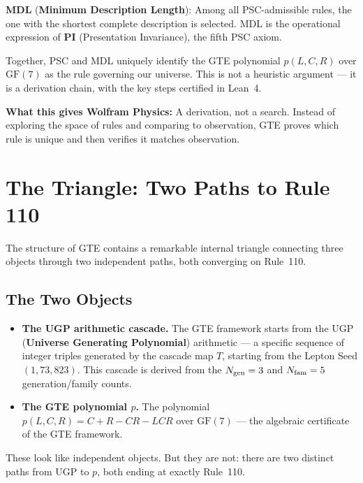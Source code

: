 \documentclass[11pt,a4paper]{article}
\newcommand{\term}[1]{\textbf{#1}}
\begin{document}
\textbf{MDL} (\term{Minimum Description Length}):  Among all PSC-admissible
rules, the one with the shortest complete description is selected.  MDL is the
operational expression of \term{PI} (Presentation Invariance), the fifth PSC
axiom.

Together, PSC and MDL uniquely identify the GTE polynomial $p(L,C,R)$ over
$\mathrm{GF}(7)$ as the rule governing our universe.  This is not a heuristic
argument — it is a derivation chain, with the key steps certified in Lean~4.

\textbf{What this gives Wolfram Physics:} A derivation, not a search.  Instead
of exploring the space of rules and comparing to observation, GTE proves which
rule is unique and then verifies it matches observation.

\section{The Triangle: Two Paths to Rule 110}
\label{sec:triangle}

The structure of GTE contains a remarkable internal triangle connecting three
objects through two independent paths, both converging on Rule~110.

\subsection{The Two Objects}

\begin{itemize}[itemsep=4pt]
  \item \textbf{The UGP arithmetic cascade.}  The GTE framework starts from the
    UGP (\term{Universe Generating Polynomial}) arithmetic — a specific sequence
    of integer triples generated by the cascade map $T$, starting from the
    Lepton Seed $(1,73,823)$.  This cascade is derived from the
    $N_{\rm gen} = 3$ and $N_{\rm fam} = 5$ generation/family counts.

  \item \textbf{The GTE polynomial $p$.}  The polynomial
    $p(L,C,R) = C + R - CR - LCR$ over $\mathrm{GF}(7)$ — the algebraic
    certificate of the GTE framework.
\end{itemize}

These look like independent objects.  But they are not: there are two distinct
paths from UGP to $p$, both ending at exactly Rule~110.
\end{document}
